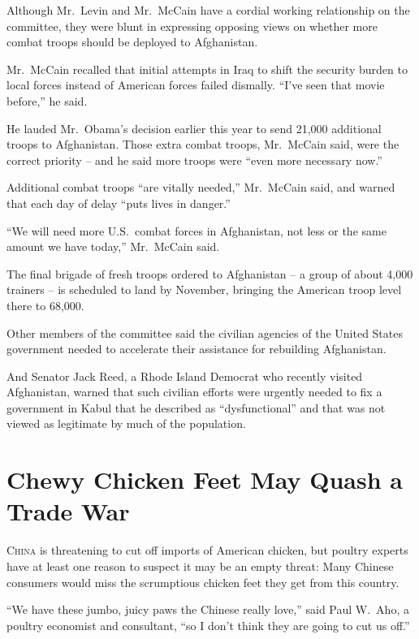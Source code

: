 ﻿\documentclass[12pt]{article}
\begin{document}
Although Mr.~Levin and Mr.~McCain have a cordial working relationship on the committee, they were
blunt in expressing opposing views on whether more combat troops should be deployed to Afghanistan.

Mr.~McCain recalled that initial attempts in Iraq to shift the security burden to local forces
instead of American forces failed dismally. ``I've seen that movie before,'' he said.

He lauded\cite{laud} Mr.~Obama's decision earlier this year to send 21,000 additional troops to
Afghanistan. Those extra combat troops, Mr.~McCain said, were the correct priority -- and he said
more troops were ``even more necessary now.''

Additional combat troops ``are vitally needed,'' Mr.~McCain said, and warned that each day of delay
``puts lives in danger.''

``We will need more U.S.~combat forces in Afghanistan, not less or the same amount we have today,''
Mr.~McCain said.

The final brigade\cite{brigade} of fresh troops ordered to Afghanistan -- a group of about 4,000
trainers -- is scheduled to land by November, bringing the American troop level there to 68,000.

Other members of the committee said the civilian agencies of the United States government needed to
accelerate their assistance for rebuilding Afghanistan.

And Senator Jack Reed, a Rhode Island Democrat who recently visited Afghanistan, warned that such
civilian efforts were urgently needed to fix a government in Kabul that he described as
``dysfunctional'' and that was not viewed as legitimate\cite{legitimate} by much of the population.

\section{Chewy Chicken Feet May Quash\cite{quash} a Trade War}

\lettrine{C}{hina} is threatening to cut off imports of American chicken, but poultry experts have
at least one reason to suspect it may be an empty threat: Many Chinese consumers would miss the
scrumptious\cite{scrumptious} chicken feet they get from this country.

``We have these jumbo, juicy paws the Chinese really love,'' said Paul W.~Aho, a poultry economist
and consultant, ``so I don't think they are going to cut us off.''
\end{document}
